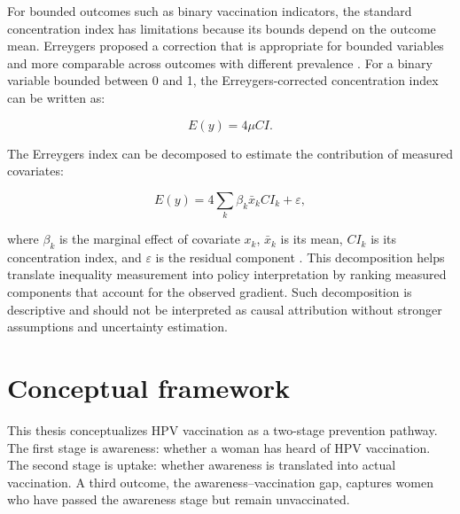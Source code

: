 For bounded outcomes such as binary vaccination indicators, the standard concentration index has limitations because its bounds depend on the outcome mean. Erreygers proposed a correction that is appropriate for bounded variables and more comparable across outcomes with different prevalence \cite{erreygers2009}. For a binary variable bounded between 0 and 1, the Erreygers-corrected concentration index can be written as:

\begin{equation}
E(y) = 4\mu CI.
\end{equation}

The Erreygers index can be decomposed to estimate the contribution of measured covariates:

\begin{equation}
E(y) = 4\sum_k \beta_k \bar{x}_k CI_k + \varepsilon,
\end{equation}

\noindent where $\beta_k$ is the marginal effect of covariate $x_k$, $\bar{x}_k$ is its mean, $CI_k$ is its concentration index, and $\varepsilon$ is the residual component \cite{wagstaff2003,erreygers2009}. This decomposition helps translate inequality measurement into policy interpretation by ranking measured components that account for the observed gradient. Such decomposition is descriptive and should not be interpreted as causal attribution without stronger assumptions and uncertainty estimation.

\section{Conceptual framework}

This thesis conceptualizes HPV vaccination as a two-stage prevention pathway. The first stage is awareness: whether a woman has heard of HPV vaccination. The second stage is uptake: whether awareness is translated into actual vaccination. A third outcome, the awareness--vaccination gap, captures women who have passed the awareness stage but remain unvaccinated.

